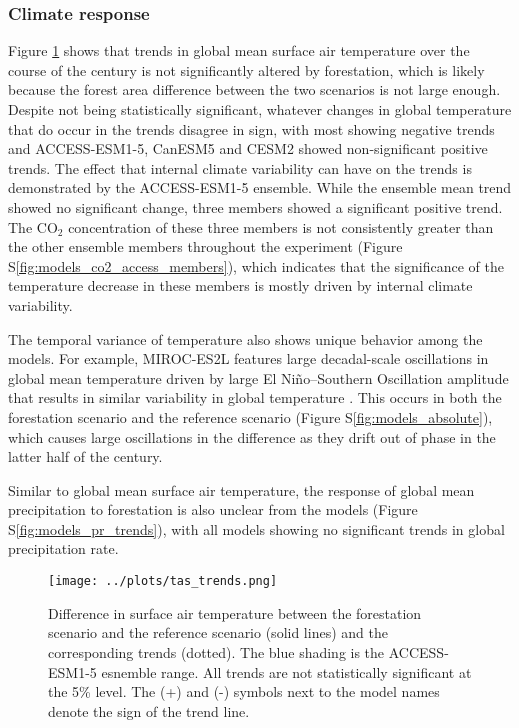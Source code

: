 \documentclass[]{article}
\begin{document}
\subsubsection{Climate response}

Figure \ref{fig:models_tas_trends} shows that trends in global mean surface air temperature over the course of the century is not significantly altered by forestation, which is likely because the forest area difference between the two scenarios is not large enough.
Despite not being statistically significant, whatever changes in global temperature that do occur in the trends disagree in sign, with most showing negative trends and ACCESS-ESM1-5, CanESM5 and CESM2 showed non-significant positive trends.
The effect that internal climate variability can have on the trends is demonstrated by the ACCESS-ESM1-5 ensemble.
While the ensemble mean trend showed no significant change, three members showed a significant positive trend.
The CO$_2$ concentration of these three members is not consistently greater than the other ensemble members throughout the experiment (Figure S\ref{fig:models_co2_access_members}), which indicates that the significance of the temperature decrease in these members is mostly driven by internal climate variability.

The temporal variance of temperature also shows unique behavior among the models.
For example, MIROC-ES2L features large decadal-scale oscillations in global mean temperature driven by large El Niño–Southern Oscillation amplitude that results in similar variability in global temperature \parencite{hajima_development_2020}.
This occurs in both the forestation scenario and the reference scenario (Figure S\ref{fig:models_absolute}), which causes large oscillations in the difference as they drift out of phase in the latter half of the century.

Similar to global mean surface air temperature, the response of global mean precipitation to forestation is also unclear from the models (Figure S\ref{fig:models_pr_trends}), with all models showing no significant trends in global precipitation rate.

\begin{figure}[H]
    \centering
    \texttt{[image: ../plots/tas\_trends.png]}
    \caption{Difference in surface air temperature between the forestation scenario and the reference scenario (solid lines) and the corresponding trends (dotted). The blue shading is the ACCESS-ESM1-5 esnemble range. All trends are not statistically significant at the 5\% level. The (+) and (-) symbols next to the model names denote the sign of the trend line.}
    \label{fig:models_tas_trends}
\end{figure}
\end{document}
